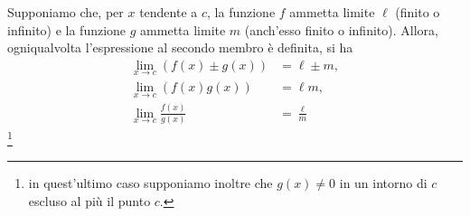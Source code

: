 \documentclass{book}
\begin{document}
\begin{theorem}
    Supponiamo che, per \( x \) tendente a \( c \), la funzione \( f \) ammetta limite \( \ell \) (finito o infinito) e la funzione \( g \) ammetta limite \( m \) (anch'esso finito o infinito). Allora, ogniqualvolta l'espressione al secondo membro è definita, si ha
    \begin{align*}
        \lim_{x \to c} (f(x) \pm g(x))   & = \ell \pm m,    \\
        \lim_{x \to c} (f(x)g(x))        & = \ell m,        \\
        \lim_{x \to c} \frac{f(x)}{g(x)} & = \frac{\ell}{m}
    \end{align*}
    \footnote[1]{in quest'ultimo caso supponiamo inoltre che \(g(x) \neq 0\) in un intorno di \(c\) escluso al più il punto \(c\).}
\end{theorem}
\end{document}
